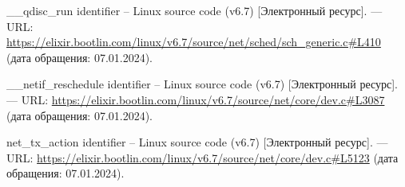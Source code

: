 \begin{thebibliography}{}
 \_\_qdisc\_run identifier -- Linux source code (v6.7) [Электронный ресурс]. --- URL: \url{https://elixir.bootlin.com/linux/v6.7/source/net/sched/sch_generic.c#L410} (дата обращения: 07.01.2024).

 \_\_netif\_reschedule identifier -- Linux source code (v6.7) [Электронный ресурс]. --- URL: \url{https://elixir.bootlin.com/linux/v6.7/source/net/core/dev.c#L3087} (дата обращения: 07.01.2024).

 net\_tx\_action identifier -- Linux source code (v6.7) [Электронный ресурс]. --- URL: \url{https://elixir.bootlin.com/linux/v6.7/source/net/core/dev.c#L5123} (дата обращения: 07.01.2024).

\end{thebibliography}